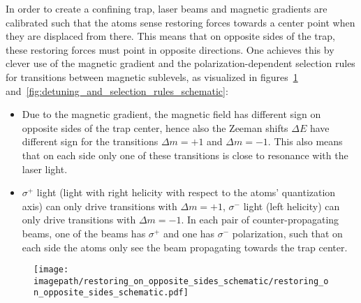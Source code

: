 In order to create a confining trap, laser beams and magnetic gradients are calibrated such that the atoms sense restoring forces towards a center point when they are displaced from there. This means that on opposite sides of the trap, these restoring forces must point in opposite directions. One achieves this by clever use of the magnetic gradient and the polarization-dependent selection rules for transitions between magnetic sublevels, as visualized in figures~\ref{fig:restoring_on_opposite_sides_schematic} and~\ref{fig:detuning_and_selection_rules_schematic}:
\begin{itemize}
    \item Due to the magnetic gradient, the magnetic field has different sign on opposite sides of the trap center, hence also the Zeeman shifts $\Delta E$ have different sign for the transitions $\Delta m = +1$ and $\Delta m = -1$. This also means that on each side only one of these transitions is close to resonance with the laser light.
    \item $\sigma^+$ light (light with right helicity with respect to the atoms' quantization axis) can only drive transitions with $\Delta m = +1$, $\sigma^-$ light (left helicity) can only drive transitions with $\Delta m = -1$. In each pair of counter-propagating beams, one of the beams has $\sigma^+$ and one has $\sigma^-$ polarization, such that on each side the atoms only see the beam propagating towards the trap center.
\end{itemize}

\begin{figure}
    \centering
    \texttt{[image: \\imagepath/restoring\_on\_opposite\_sides\_schematic/restoring\_on\_opposite\_sides\_schematic.pdf]}
    \caption{
    }\label{fig:restoring_on_opposite_sides_schematic}
\end{figure} 

